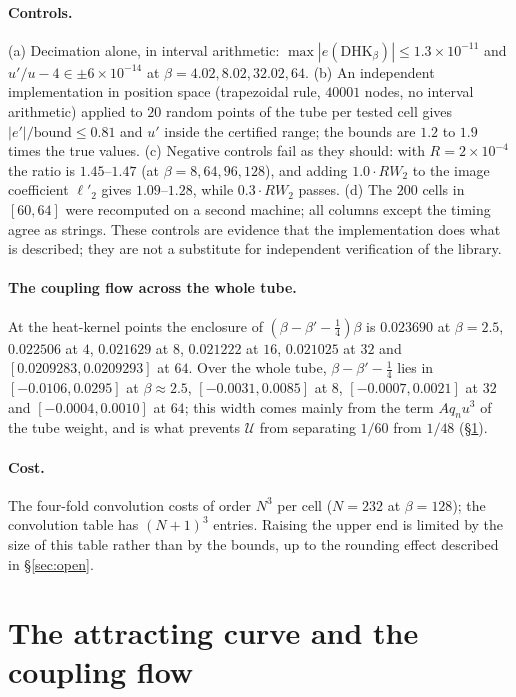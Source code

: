 \documentclass[11pt,a4paper]{article}
\theoremstyle{definition}
\theoremstyle{remark}
\newcommand{\HK}{\mathrm{HK}}
\newcommand{\cU}{\mathcal{U}}
\begin{document}
\paragraph{Controls.}
(a) Decimation alone, in interval arithmetic: $\max|e(\mathrm{D}\HK_\beta)|\le1.3\times10^{-11}$ and $u'/u-4\in\pm6\times10^{-14}$ at $\beta=4.02,8.02,32.02,64$.
(b) An independent implementation in position space (trapezoidal rule, $40001$ nodes, no interval arithmetic) applied to $20$ random points of the tube per tested cell gives $|e'|/\mathrm{bound}\le0.81$ and $u'$ inside the certified range; the bounds are $1.2$ to $1.9$ times the true values.
(c) Negative controls fail as they should: with $R=2\times10^{-4}$ the ratio is $1.45$--$1.47$ (at $\beta=8,64,96,128$), and adding $1.0\cdot RW_2$ to the image coefficient $\ell'_2$ gives $1.09$--$1.28$, while $0.3\cdot RW_2$ passes.
(d) The $200$ cells in $[60,64]$ were recomputed on a second machine; all columns except the timing agree as strings.
These controls are evidence that the implementation does what is described; they are not a substitute for independent verification of the library.

\paragraph{The coupling flow across the whole tube.}
At the heat-kernel points the enclosure of $(\beta-\beta'-\tfrac14)\beta$ is $0.023690$ at $\beta=2.5$, $0.022506$ at $4$, $0.021629$ at $8$, $0.021222$ at $16$, $0.021025$ at $32$ and $[0.0209283,0.0209293]$ at $64$.
Over the whole tube, $\beta-\beta'-\tfrac14$ lies in $[-0.0106,0.0295]$ at $\beta\approx2.5$, $[-0.0031,0.0085]$ at $8$, $[-0.0007,0.0021]$ at $32$ and $[-0.0004,0.0010]$ at $64$; this width comes mainly from the term $Aq_nu^3$ of the tube weight, and is what prevents $\cU$ from separating $1/60$ from $1/48$ (\S\ref{sec:curve}).

\paragraph{Cost.}
The four-fold convolution costs of order $N^3$ per cell ($N=232$ at $\beta=128$); the convolution table has $(N+1)^3$ entries.
Raising the upper end is limited by the size of this table rather than by the bounds, up to the rounding effect described in \S\ref{sec:open}.

\section{The attracting curve and the coupling flow}\label{sec:curve}
\end{document}
